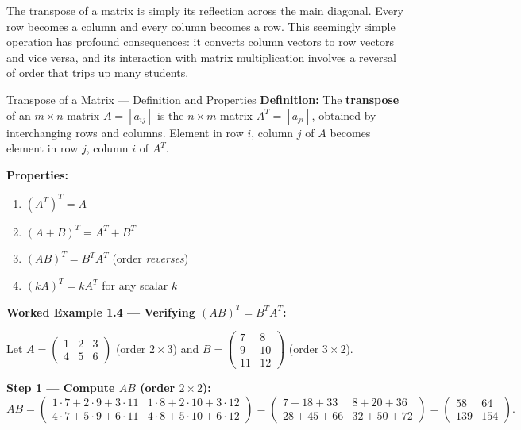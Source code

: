 \documentclass[12pt,a4paper]{article}
\begin{document}
The transpose of a matrix is simply its reflection across the main diagonal. Every row becomes a column and every column becomes a row. This seemingly simple operation has profound consequences: it converts column vectors to row vectors and vice versa, and its interaction with matrix multiplication involves a reversal of order that trips up many students.

\begin{infobox}{Transpose of a Matrix --- Definition and Properties}
\textbf{Definition:} The \textbf{transpose} of an $m \times n$ matrix $A = [a_{ij}]$ is the $n \times m$ matrix $A^T = [a_{ji}]$, obtained by interchanging rows and columns. Element in row $i$, column $j$ of $A$ becomes element in row $j$, column $i$ of $A^T$.

\textbf{Properties:}
\begin{enumerate}[label=(\roman*)]
  \item $(A^T)^T = A$
  \item $(A + B)^T = A^T + B^T$
  \item $(AB)^T = B^T A^T$ \quad (order \emph{reverses})
  \item $(kA)^T = k A^T$ for any scalar $k$
\end{enumerate}
\end{infobox}

\textbf{Worked Example 1.4 --- Verifying $(AB)^T = B^T A^T$:}

Let $A = \begin{pmatrix} 1 & 2 & 3 \\ 4 & 5 & 6 \end{pmatrix}$ (order $2 \times 3$) and $B = \begin{pmatrix} 7 & 8 \\ 9 & 10 \\ 11 & 12 \end{pmatrix}$ (order $3 \times 2$).

\textbf{Step 1 --- Compute $AB$ (order $2 \times 2$):}
\[
AB = \begin{pmatrix} 1\cdot7+2\cdot9+3\cdot11 & 1\cdot8+2\cdot10+3\cdot12 \\ 4\cdot7+5\cdot9+6\cdot11 & 4\cdot8+5\cdot10+6\cdot12 \end{pmatrix} = \begin{pmatrix} 7+18+33 & 8+20+36 \\ 28+45+66 & 32+50+72 \end{pmatrix} = \begin{pmatrix} 58 & 64 \\ 139 & 154 \end{pmatrix}.
\]
\end{document}
